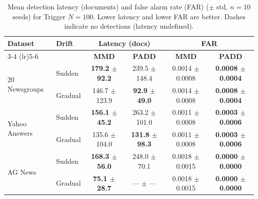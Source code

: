 \begin{table}[htbp]
  \centering
  \caption{Mean detection latency (documents) and false alarm rate (FAR)
           ($\pm$ std, $n=10$ seeds) for Trigger $N=100$.
           Lower latency and lower FAR are better.
           Dashes indicate no detections (latency undefined).}
  \label{tab:cross_dataset_lat_far}
  \begin{tabular}{llcccc}
    \toprule
    \multirow{2}{*}{\textbf{Dataset}}
      & \multirow{2}{*}{\textbf{Drift}}
      & \multicolumn{2}{c}{\textbf{Latency (docs)}}
      & \multicolumn{2}{c}{\textbf{FAR}} \\
    \cmidrule(lr){3-4} \cmidrule(lr){5-6}
      & & \textbf{MMD} & \textbf{PADD}
        & \textbf{MMD} & \textbf{PADD} \\
    \midrule
    \multirow{2}{*}{20 Newsgroups} & Sudden & \textbf{179.2 $\pm$ 92.2} & 239.5 $\pm$ 148.4 & 0.0014 $\pm$ 0.0008 & \textbf{0.0008 $\pm$ 0.0004} \\
     & Gradual & 146.7 $\pm$ 123.9 & \textbf{92.9 $\pm$ 49.0} & 0.0014 $\pm$ 0.0008 & \textbf{0.0008 $\pm$ 0.0004} \\
    \midrule
    \multirow{2}{*}{Yahoo Answers} & Sudden & \textbf{156.1 $\pm$ 45.2} & 263.2 $\pm$ 101.0 & 0.0011 $\pm$ 0.0008 & \textbf{0.0003 $\pm$ 0.0006} \\
     & Gradual & 135.6 $\pm$ 104.0 & \textbf{131.8 $\pm$ 98.3} & 0.0011 $\pm$ 0.0008 & \textbf{0.0003 $\pm$ 0.0006} \\
    \midrule
    \multirow{2}{*}{AG News} & Sudden & \textbf{168.3 $\pm$ 56.0} & 248.0 $\pm$ 70.1 & 0.0018 $\pm$ 0.0015 & \textbf{0.0000 $\pm$ 0.0000} \\
     & Gradual & \textbf{75.1 $\pm$ 28.7} & --- $\pm$ --- & 0.0018 $\pm$ 0.0015 & \textbf{0.0000 $\pm$ 0.0000} \\
    \bottomrule
  \end{tabular}
\end{table}
